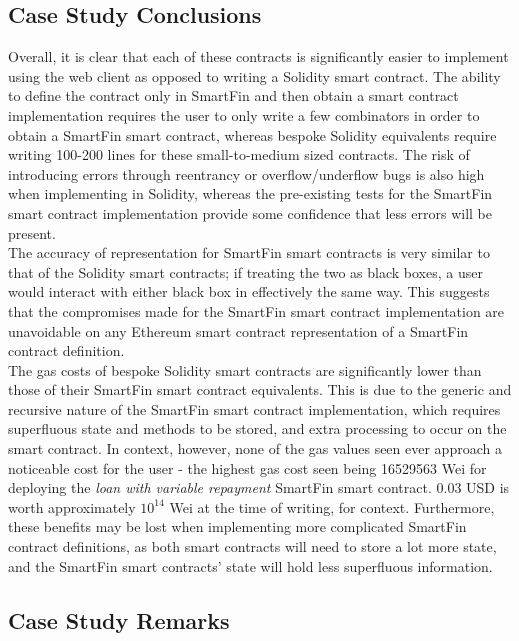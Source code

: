 \subsection{Case Study Conclusions}

Overall, it is clear that each of these contracts is significantly easier to implement using the web client as opposed to writing a Solidity smart contract. The ability to define the contract only in SmartFin and then obtain a smart contract implementation requires the user to only write a few combinators in order to obtain a SmartFin smart contract, whereas bespoke Solidity equivalents require writing 100-200 lines for these small-to-medium sized contracts. The risk of introducing errors through reentrancy or overflow/underflow bugs is also high when implementing in Solidity, whereas the pre-existing tests for the SmartFin smart contract implementation provide some confidence that less errors will be present. \\

The accuracy of representation for SmartFin smart contracts is very similar to that of the Solidity smart contracts; if treating the two as black boxes, a user would interact with either black box in effectively the same way. This suggests that the compromises made for the SmartFin smart contract implementation are unavoidable on any Ethereum smart contract representation of a SmartFin contract definition. \\

The gas costs of bespoke Solidity smart contracts are significantly lower than those of their SmartFin smart contract equivalents. This is due to the generic and recursive nature of the SmartFin smart contract implementation, which requires superfluous state and methods to be stored, and extra processing to occur on the smart contract. In context, however, none of the gas values seen ever approach a noticeable cost for the user - the highest gas cost seen being 16529563 Wei for deploying the \textit{loan with variable repayment} SmartFin smart contract. 0.03 USD is worth approximately $10^{14}$ Wei at the time of writing, for context\cite{eth-usd}. Furthermore, these benefits may be lost when implementing more complicated SmartFin contract definitions, as both smart contracts will need to store a lot more state, and the SmartFin smart contracts' state will hold less superfluous information.


\subsection{Case Study Remarks}

